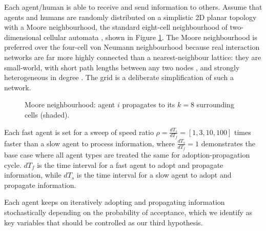 \documentclass{article}
\begin{document}
Each agent/human is able to receive and send information to others. Assume that agents and humans are randomly distributed on a simplistic 2D planar topology with a Moore neighbourhood, the standard eight-cell neighbourhood of two-dimensional cellular automata \cite{wolfram1983}, shown in Figure \ref{fig:fig1}. The Moore neighbourhood is preferred over the four-cell von Neumann neighbourhood because real interaction networks are far more highly connected than a nearest-neighbour lattice: they are small-world, with short path lengths between any two nodes \cite{watts1998}, and strongly heterogeneous in degree \cite{barabasi1999}. The grid is a deliberate simplification of such a network. \\

\begin{figure}[ht]
    \centering
    \caption{Moore neighbourhood: agent $i$ propagates to its $k=8$ surrounding cells (shaded).}
    \label{fig:fig1}
\end{figure}

Each fast agent is set for a sweep of speed ratio $\rho = \frac{dT_s}{dT_f}= [1, 3, 10, 100]$ times faster than a slow agent to process information, where $\frac{dT_s}{dT_f}= 1$ demonstrates the base case where all agent types are treated the same for adoption-propagation cycle. $dT_f$ is the time interval for a fast agent to adopt and propagate information, while $dT_s$ is the time interval for a slow agent to adopt and propagate information.


Each agent keeps on iteratively adopting and propagating information stochastically depending on the probability of acceptance, which we identify as key variables that should be controlled as our third hypothesis. \\
\end{document}

